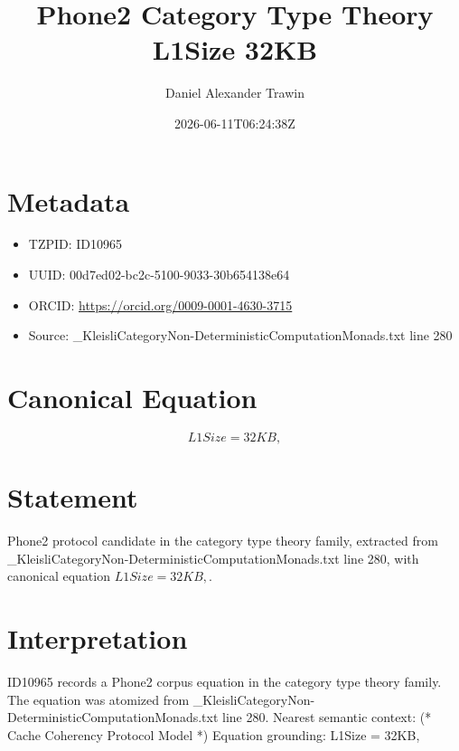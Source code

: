 \documentclass[11pt]{article}
\title{Phone2 Category Type Theory L1Size 32KB}
\author{Daniel Alexander Trawin}
\date{2026-06-11T06:24:38Z}
\begin{document}
\maketitle
\section*{Metadata}
\begin{itemize}
\item TZPID: ID10965
\item UUID: 00d7ed02-bc2c-5100-9033-30b654138e64
\item ORCID: \url{https://orcid.org/0009-0001-4630-3715}
\item Source: _KleisliCategoryNon-DeterministicComputationMonads.txt line 280
\end{itemize}
\section*{Canonical Equation}
\[
L1Size = 32KB,
\]
\section*{Statement}
Phone2 protocol candidate in the category type theory family, extracted from _KleisliCategoryNon-DeterministicComputationMonads.txt line 280, with canonical equation $L1Size = 32KB,$.
\section*{Interpretation}
ID10965 records a Phone2 corpus equation in the category type theory family. The equation was atomized from _KleisliCategoryNon-DeterministicComputationMonads.txt line 280. Nearest semantic context: (* Cache Coherency Protocol Model *) Equation grounding: L1Size = 32KB,
\end{document}
